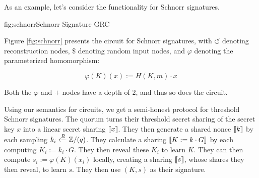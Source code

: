 As an example, let's consider the functionality for Schnorr signatures.

\begin{afigure}{fig:schnorr}{Schnorr Signature GRC}
\end{afigure}

Figure \ref{fig:schnorr} presents the circuit for Schnorr signatures,
with $\circlearrowleft$ denoting reconstruction nodes,
$\$$ denoting random input nodes, and $\varphi$ denoting
the parameterized homomorphism:

$$
\varphi(K)(x) := H(K, m) \cdot x
$$

Both the $\varphi$ and $+$ nodes have a depth of $2$, and thus so
does the circuit.

Using our semantics for circuits, we get a semi-honest protocol for
threshold Schnorr signatures. The quorum turns their threshold
secret sharing of the secret key $x$ into a linear secret sharing $\llbracket x\rrbracket$.
They then generate a shared nonce $\llbracket k\rrbracket$ by each sampling
$k_i \xleftarrow{R} \mathbb{Z}/(q)$. They calculate a sharing $\llbracket K := k \cdot G\rrbracket$
by each computing $K_i := k_i \cdot G$. They then reveal these $K_i$ to
learn $K$. They can then compute $s_i := \varphi(K)(x_i)$ locally,
creating a sharing $\llbracket s\rrbracket$, whose shares they then reveal,
to learn $s$. They then use $(K, s)$ as their signature.

